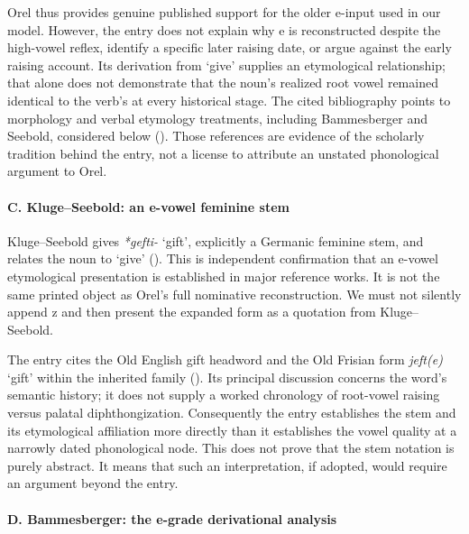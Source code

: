 \documentclass[
  british,
  a4paper,
]{article}
\providecommand{\Recon}[1]{\emph{*#1}}
\begin{document}
Orel thus provides genuine published support for the older e-input used
in our model. However, the entry does not explain why e is reconstructed
despite the high-vowel reflex, identify a specific later raising date,
or argue against the early raising account. Its derivation from `give'
supplies an etymological relationship; that alone does not demonstrate
that the noun's realized root vowel remained identical to the verb's at
every historical stage. The cited bibliography points to morphology and
verbal etymology treatments, including Bammesberger and Seebold,
considered below (). Those
references are evidence of the scholarly tradition behind the entry, not
a license to attribute an unstated phonological argument to Orel.

\paragraph{C. Kluge--Seebold: an e-vowel feminine
stem}\label{c.-klugeseebold-an-e-vowel-feminine-stem}

Kluge--Seebold gives \Recon{gefti-} `gift', explicitly a Germanic
feminine stem, and relates the noun to `give'
(). This is independent
confirmation that an e-vowel etymological presentation is established in
major reference works. It is not the same printed object as Orel's full
nominative reconstruction. We must not silently append z and then
present the expanded form as a quotation from Kluge--Seebold.

The entry cites the Old English gift headword and the Old Frisian form
\emph{jeft(e)} `gift' within the inherited family
(). Its principal
discussion concerns the word's semantic history; it does not supply a
worked chronology of root-vowel raising versus palatal diphthongization.
Consequently the entry establishes the stem and its etymological
affiliation more directly than it establishes the vowel quality at a
narrowly dated phonological node. This does not prove that the stem
notation is purely abstract. It means that such an interpretation, if
adopted, would require an argument beyond the entry.

\paragraph{D. Bammesberger: the e-grade derivational
analysis}\label{d.-bammesberger-the-e-grade-derivational-analysis}
\end{document}
